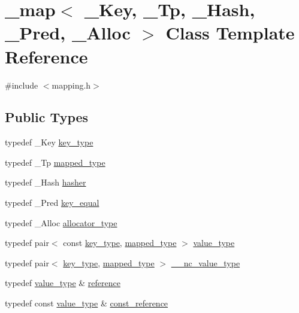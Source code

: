 \hypertarget{class__map}{}\section{\+\_\+map$<$ \+\_\+\+Key, \+\_\+\+Tp, \+\_\+\+Hash, \+\_\+\+Pred, \+\_\+\+Alloc $>$ Class Template Reference}
\label{class__map}


{\ttfamily \#include $<$mapping.\+h$>$}

\subsection*{Public Types}
\begin{DoxyCompactItemize}
\item 
typedef \+\_\+\+Key \hyperlink{class__map_a38e77c21e3aba60e817666c55ff61164}{key\+\_\+type}
\item 
typedef \+\_\+\+Tp \hyperlink{class__map_a652392c4150010664c8b1b76e460ae0a}{mapped\+\_\+type}
\item 
typedef \+\_\+\+Hash \hyperlink{class__map_a1ca536646126d87b3ac0b7fe3aee3534}{hasher}
\item 
typedef \+\_\+\+Pred \hyperlink{class__map_ac341e21272b7041e034855227f1cce49}{key\+\_\+equal}
\item 
typedef \+\_\+\+Alloc \hyperlink{class__map_ab38dd0bcf1867887afc2be61257ef025}{allocator\+\_\+type}
\item 
typedef pair$<$ const \hyperlink{class__map_a38e77c21e3aba60e817666c55ff61164}{key\+\_\+type}, \hyperlink{class__map_a652392c4150010664c8b1b76e460ae0a}{mapped\+\_\+type} $>$ \hyperlink{class__map_a840dcfbf8726d7ecdd0298ffc6afde52}{value\+\_\+type}
\item 
typedef pair$<$ \hyperlink{class__map_a38e77c21e3aba60e817666c55ff61164}{key\+\_\+type}, \hyperlink{class__map_a652392c4150010664c8b1b76e460ae0a}{mapped\+\_\+type} $>$ \hyperlink{class__map_acee1b994658827e62a6bdebca910a233}{\+\_\+\+\_\+nc\+\_\+value\+\_\+type}
\item 
typedef \hyperlink{class__map_a840dcfbf8726d7ecdd0298ffc6afde52}{value\+\_\+type} \& \hyperlink{class__map_a1c5ff1b6621aa3b9adc9bb651ffd4969}{reference}
\item 
typedef const \hyperlink{class__map_a840dcfbf8726d7ecdd0298ffc6afde52}{value\+\_\+type} \& \hyperlink{class__map_afeab752350dfbac51c9a35d67270c99f}{const\+\_\+reference}

\end{DoxyCompactItemize}
